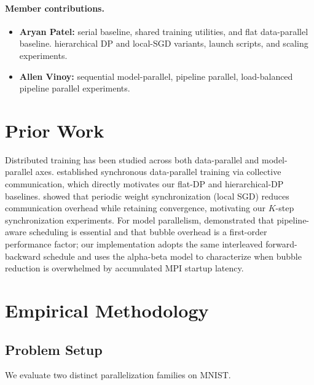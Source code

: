 \documentclass[11pt]{article}
\begin{document}
\paragraph{Member contributions.}
\begin{itemize}[nosep]
  \item \textbf{Aryan Patel:} serial baseline, shared
        training utilities, and flat data-parallel baseline. hierarchical DP and local-SGD variants, launch scripts, and scaling experiments.
  \item \textbf{Allen Vinoy:} sequential model-parallel, pipeline parallel, load-balanced pipeline parallel experiments.
\end{itemize}


\section{Prior Work}
\label{sec:prior}

Distributed training has been studied across both data-parallel and
model-parallel axes. \citet{ref1} established synchronous data-parallel
training via collective communication, which directly motivates our flat-DP
and hierarchical-DP baselines. \citet{ref2} showed that periodic weight
synchronization (local SGD) reduces communication overhead while retaining
convergence, motivating our \(K\)-step synchronization experiments.
For model parallelism, \citet{ref3} demonstrated that pipeline-aware
scheduling is essential and that bubble overhead is a first-order performance
factor; our implementation adopts the same interleaved forward-backward
schedule and uses the alpha-beta model to characterize when bubble reduction
is overwhelmed by accumulated MPI startup latency.

\section{Empirical Methodology}
\label{sec:methodology}
\subsection{Problem Setup}
We evaluate two distinct parallelization families on MNIST.
\end{document}
